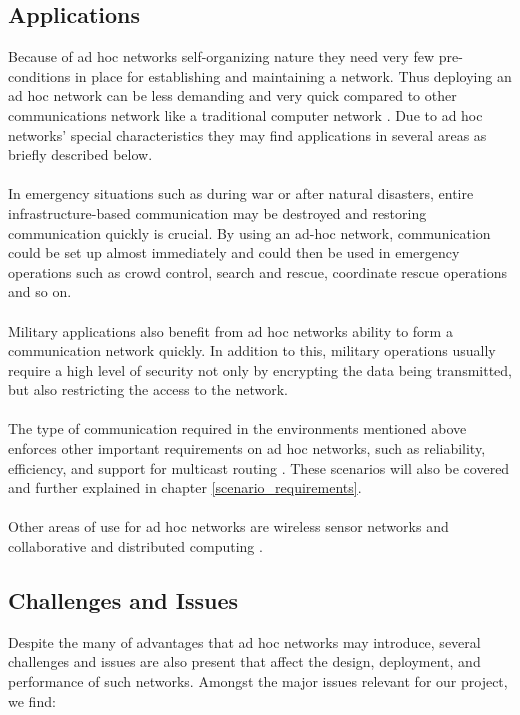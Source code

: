 \subsection{Applications}
\label{ad_hoc_applications}
Because of ad hoc networks self-organizing nature they need very few pre-conditions in place for establishing and maintaining a network. Thus deploying an ad hoc network can be less demanding and very quick compared to other communications network like a traditional computer network \cite{murthy-ad}. Due to ad hoc networks' special characteristics they may find applications in several areas as briefly described below.
\\\\
In emergency situations such as during war or after natural disasters, entire infrastructure-based communication may be destroyed and restoring communication quickly is crucial. By using an ad-hoc network, communication could be set up almost immediately and could then be used in emergency operations such as crowd control, search and rescue, coordinate rescue operations and so on.
\\\\
Military applications also benefit from ad hoc networks ability to form a communication network quickly. In addition to this, military operations usually require a high level of security not only by encrypting the data being transmitted, but also restricting the access to the network.
\\\\
The type of communication required in the environments mentioned above enforces other important requirements on ad hoc networks, such as reliability, efficiency, and support for multicast routing \cite{murthy-ad}. These scenarios will also be covered and further explained in chapter \ref{scenario_requirements}.
\\\\
Other areas of use for ad hoc networks are wireless sensor networks and collaborative and distributed computing \cite{murthy-ad}.

\subsection{Challenges and Issues}
\label{ad_hoc_challenges}
Despite the many of advantages that ad hoc networks may introduce, several challenges and issues are also present that affect the design, deployment, and performance of such networks. Amongst the major issues relevant for our project, we find:

